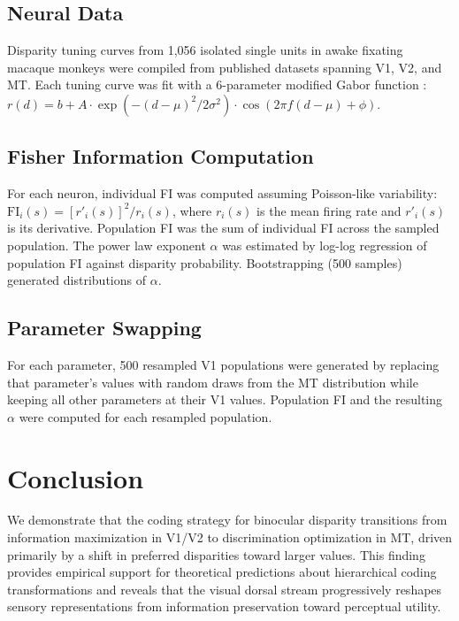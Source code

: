 \documentclass[11pt]{article}
\begin{document}
\subsection{Neural Data}

Disparity tuning curves from 1,056 isolated single units in awake fixating macaque monkeys were compiled from published datasets spanning V1, V2, and MT. Each tuning curve was fit with a 6-parameter modified Gabor function \citep{gabor_function1946}: $r(d) = b + A \cdot \exp(-(d - \mu)^2 / 2\sigma^2) \cdot \cos(2\pi f(d - \mu) + \phi)$.

\subsection{Fisher Information Computation}

For each neuron, individual FI was computed assuming Poisson-like variability: $\text{FI}_i(s) = [r'_i(s)]^2 / r_i(s)$, where $r_i(s)$ is the mean firing rate and $r'_i(s)$ is its derivative. Population FI was the sum of individual FI across the sampled population. The power law exponent $\alpha$ was estimated by log-log regression of population FI against disparity probability. Bootstrapping (500 samples) generated distributions of $\alpha$.

\subsection{Parameter Swapping}

For each parameter, 500 resampled V1 populations were generated by replacing that parameter's values with random draws from the MT distribution while keeping all other parameters at their V1 values. Population FI and the resulting $\alpha$ were computed for each resampled population.

\section{Conclusion}

We demonstrate that the coding strategy for binocular disparity transitions from information maximization in V1/V2 to discrimination optimization in MT, driven primarily by a shift in preferred disparities toward larger values. This finding provides empirical support for theoretical predictions about hierarchical coding transformations and reveals that the visual dorsal stream progressively reshapes sensory representations from information preservation toward perceptual utility.



\end{document}
